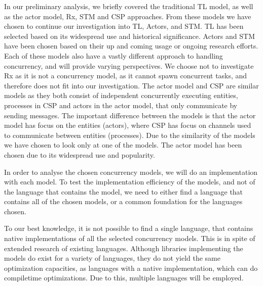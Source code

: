 In our preliminary analysis, we briefly covered the traditional \ac{TL} model, as well as the actor model, \ac{Rx}, \ac{STM} and \ac{CSP} approaches. From these models we have chosen to continue our investigation into \ac{TL}, Actors, and \ac{STM}. \ac{TL} has been selected based on its widespread use and historical significance. Actors and \ac{STM} have been chosen based on their up and coming usage or ongoing research efforts. Each of these models also have a vastly different approach to handling concurrency, and will provide varying perspectives. We choose not to investigate \ac{Rx} as it is not a concurrency model, as it cannot spawn concurrent tasks, and therefore does not fit into our investigation. The actor model and CSP are similar models as they both consist of independent concurrently executing entities, processes in CSP and actors in the actor model, that only communicate by sending messages. The important difference between the models is that the actor model has focus on the entities (actors), where CSP has focus on channels used to communicate between entities (processes)\cite[p. 153]{sevenModels}. Due to the similarity of the models we have chosen to look only at one of the models. The actor model has been chosen due to its widespread use and popularity.

In order to analyse the chosen concurrency models, we will do an implementation with each model. To test the implementation efficiency of the models, and not of the language that contains the model, we need to either find a language that contains all of the chosen models, or a common foundation for the languages chosen. 

To our best knowledge, it is not possible to find a single language, that contains native implementations of all the selected concurrency models. This is in spite of extended research of existing languages. Although libraries implementing the models do exist for a variety of languages, they do not yield the same optimization capacities, as languages with a native implementation, which can do compiletime optimizations. Due to this, multiple languages will be employed. 

